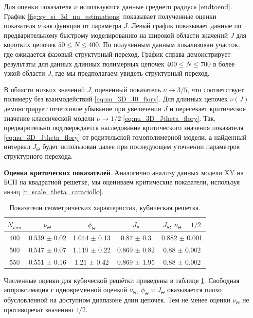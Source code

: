  
 Для оценки показателя $\nu$  используются данные среднего радиуса \eqref{endtoend}. 
 График \ref{fig:xy_si_3d_nu_estimations}  показывает  полученные оценки показателя $\nu$ как функции от параметра $J$. 
 Левый график показывает данные по предварительному быстрому моделированию на широкой области значений $J$ для коротких цепочек $ 50 \le  N \le 400$. По полученным данным локализован участок, где ожидается фазовый  структурный переход.
 График справа демонстрирует результаты для данных длинных полимерных цепочек $ 400 \le N \le 700$ в более узкой области $J$, где мы предполагаем увидеть структурный переход. 
 
 В области низких значений $J$, оцененный показатель $\nu \rightarrow 3/5 $, что соответствует полимеру без взаимодействий \eqref{eq:nu_3D_J0_flory}.  
 Для длинных цепочек $\nu(J)$ демонстрирует отчетливое убывание при увеличении $J$ и пересекает критическое значение классической модели  $\nu \rightarrow 1/2 $ \eqref{eq:nu_3D_Jtheta_flory}. 
 Так, предварительно подтверждается наследование критического значения показателя  \eqref{eq:nu_3D_Jtheta_flory} от родительской гомополимерной модели, а найденный интервал $J_{\Theta}$ будет использован далее  при последующем уточнении параметров структурного перехода.
 
  \textbf{Оценка критических показателей}.  
  Аналогично анализу данных модели XY на БСП на квадратной решетке, мы оцениваем критические показатели, используя анзац \eqref{r_scale_theta_caraciollo}. 
 
    \begin{table}[ht!]
   		\caption{Показатели геометрических характеристик, кубическая решетка.}
 	\centering
 	\begin{tabular}{ccccc}
 		$N_{min}$ & $\nu_{\Theta}$ &  $\phi_{\Theta}$ & $ J_{\theta}$  & $  J_{\theta}$, $\nu_{\Theta} = 1/2$   \\ \hline
 		
 		400 & 0.539 $\pm$ 0.02 & 1.044 $\pm$ 0.13 & 0.87 $\pm$ 0.3 & 0.882 $\pm$ 0.001 \\
 		500 & 0.547 $\pm$ 0.07 & 1.119 $\pm$ 0.22 & 0.869 $\pm$ 0.82 & 0.88 $\pm$ 0.002 \\
 		550 & 0.551 $\pm$ 0.16 & 1.21 $\pm$ 0.42 & 0.869 $\pm$ 1.95 & 0.88 $\pm$ 0.002
 	\end{tabular}
 	\label{table:estimate3d}
 \end{table}
 
  Численные оценки для кубической решётки приведены в таблице \ref{table:estimate3d}. 
  Свободная аппроксимация с одновременной оценкой $\nu_{\Theta}$, $\phi_{\Theta}$ и $J_{\Theta}$ оказывается плохо обусловленной на доступном диапазоне длин цепочек. 
  Тем не менее оценки $\nu_{\Theta}$ не противоречат значению $1/2$. 
  
